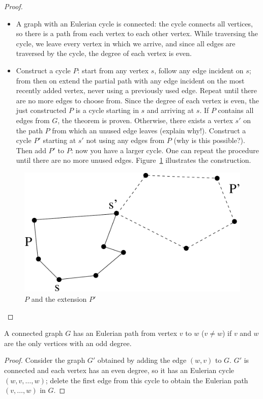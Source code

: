 \begin{proof}
~\\
\begin{itemize}
\item A graph with an Eulerian cycle is connected: the cycle connects
all vertices, so there is a path from each vertex to each other
vertex. While traversing the cycle, we leave every vertex in which we
arrive, and since all edges are traversed by the cycle, the degree of
each vertex is even.

\item Construct a cycle $P$: start from any vertex $s$, follow any
edge incident on $s$; from then on extend the partial path with any
edge incident on the most recently added vertex, never using a
previously used edge. Repeat until there are no more edges to choose
from. Since the degree of each vertex is even, the just constructed
$P$ is a cycle starting in $s$ and arriving at $s$. If $P$ contains
all edges from $G$, the theorem is proven. Otherwise, there exists a
vertex $s'$ on the path $P$ from which an unused edge leaves (explain
why!). Construct a cycle $P'$ starting at $s'$ not using any edges
from $P$ (why is this possible?). Then add $P'$ to $P$: now you have a
larger cycle. One can repeat the procedure until there are no more
unused edges. Figure~\ref{euler4} illustrates the construction.
\end{itemize}
\begin{figure}[ht]
\begin{center}
\includegraphics[width=0.4\linewidth,keepaspectratio]{euler4}
\end{center}
\caption{ $P$ and the extension $P'$ \label{euler4}}
\end{figure}
\end{proof}


\begin{theorem}
  A connected graph $G$ has an Eulerian path from vertex $v$ to $w$
  ($v \neq w$) if $v$ and $w$ are the only vertices with an odd degree.
\end{theorem}
\begin{proof}
Consider the graph $G'$ obtained by adding the edge $(w,v)$ to $G$.
$G'$ is connected and each vertex has an even degree, so it has an
Eulerian cycle $(w,v,\ldots,w)$; delete the first edge from this cycle
to obtain the Eulerian path $(v,\ldots,w)$ in $G$.
\end{proof}

